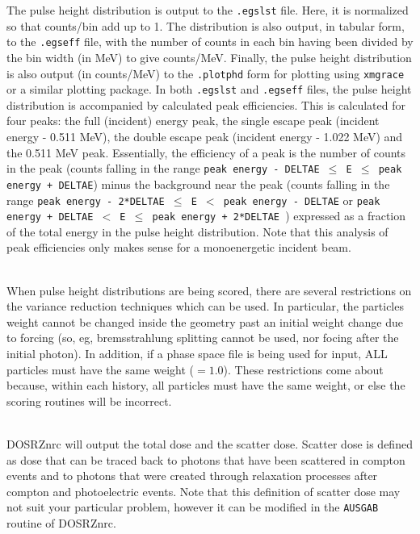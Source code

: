 \documentclass[12pt,twoside]{article}  %
\begin{document}
The pulse height distribution is output to the {\tt .egslst} file.  Here,
it is normalized so that counts/bin add up to 1.
The distribution is also output, in tabular form, to the {\tt .egseff} file,
with the number of counts in each bin having been divided by the bin
width (in MeV) to give counts/MeV.  Finally, the pulse height distribution is
also output (in counts/MeV) to the {\tt .plotphd} form for plotting using
{\tt xmgrace} or a similar plotting package.  In both {\tt .egslst} and
{\tt .egseff} files, the pulse height distribution is accompanied by
calculated peak efficiencies.  This is calculated for four peaks:
the full (incident) energy peak, the single escape peak (incident energy - 0.511 MeV), the double escape peak (incident energy - 1.022 MeV) and the
0.511 MeV peak.  Essentially, the efficiency of a peak is the number of
counts in the peak (counts falling in the range
{\tt peak energy - DELTAE $\le$ E $\leq$ peak energy + DELTAE}) minus the background
near the peak (counts falling in the range
{\tt peak energy - 2*DELTAE $\le$ E $<$ peak energy - DELTAE} or
{\tt peak energy + DELTAE $<$ E $\leq$ peak energy + 2*DELTAE }) expressed as a
fraction of the total energy in the pulse height distribution.  Note that
this analysis of peak efficiencies only makes sense for a monoenergetic
incident beam.
\label{scatsec}

\\
When pulse height distributions are being scored, there are several
restrictions on the variance reduction techniques which can be used. In
particular, the particles weight cannot be changed inside the geometry past
an initial weight change due to forcing (so, eg, bremsstrahlung splitting
cannot be used, nor focing after the initial photon). In addition, if a
phase space file is being used for input, ALL particles must have the same
weight ($= 1.0$). These restrictions come about because, within each
history, all particles must have the same weight, or else the scoring
routines will be incorrect.

\\     DOSRZnrc will output
the total dose and the scatter dose.  Scatter dose is defined as dose
that can be traced back to photons that have been scattered in
compton events and to photons that were created through relaxation processes
after compton and photoelectric events.  Note that this definition of
scatter dose may not suit your particular problem, however it can be modified
in the {\tt AUSGAB} routine of DOSRZnrc.
\end{document}
